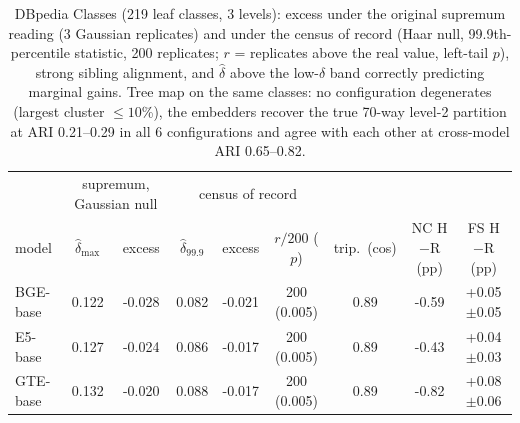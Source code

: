 \begin{table}[H]
\centering
\footnotesize
\setlength{\tabcolsep}{2.5pt}
\begin{tabular}{lcc|ccc|ccc}
\toprule
 & \multicolumn{2}{c|}{supremum, Gaussian null} & \multicolumn{3}{c|}{census of record} & & & \\
model & $\hat\delta_{\max}$ & excess & $\hat\delta_{99.9}$ & excess & $r/200$ ($p$) & trip.\ (cos) & NC H$-$R (pp) & FS H$-$R (pp) \\
\midrule
BGE-base & 0.122 & -0.028 & 0.082 & -0.021 & 200 (0.005) & 0.89 & -0.59 & +0.05$\pm$0.05 \\
E5-base & 0.127 & -0.024 & 0.086 & -0.017 & 200 (0.005) & 0.89 & -0.43 & +0.04$\pm$0.03 \\
GTE-base & 0.132 & -0.020 & 0.088 & -0.017 & 200 (0.005) & 0.89 & -0.82 & +0.08$\pm$0.06 \\
\bottomrule
\end{tabular}
\caption{DBpedia Classes (219 leaf classes, 3 levels): excess under the original supremum reading (3 Gaussian replicates) and under the census of record (Haar null, 99.9th-percentile statistic, 200 replicates; $r$ = replicates above the real value, left-tail $p$), strong sibling alignment, and $\hat\delta$ above the low-$\delta$ band correctly predicting marginal gains. Tree map on the same classes: no configuration degenerates (largest cluster $\le10$\%), the embedders recover the true 70-way level-2 partition at ARI 0.21--0.29 in all 6 configurations and agree with each other at cross-model ARI 0.65--0.82.}
\label{tab:a9}
\end{table}
